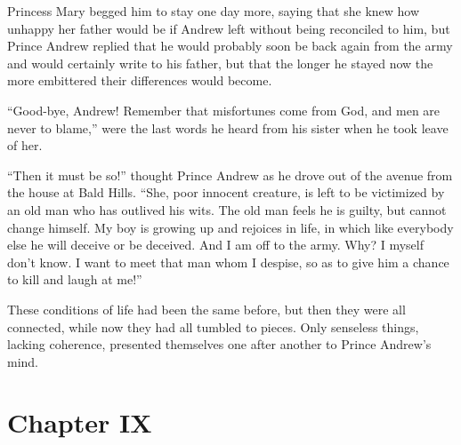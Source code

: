 Princess Mary begged him to stay one day more, saying that she
knew how unhappy her father would be if Andrew left without being
reconciled to him, but Prince Andrew replied that he would
probably soon be back again from the army and would certainly
write to his father, but that the longer he stayed now the more
embittered their differences would become.

``Good-bye, Andrew! Remember that misfortunes come from God, and
men are never to blame,'' were the last words he heard from his
sister when he took leave of her.

``Then it must be so!'' thought Prince Andrew as he drove out of
the avenue from the house at Bald Hills. ``She, poor innocent
creature, is left to be victimized by an old man who has outlived
his wits. The old man feels he is guilty, but cannot change
himself. My boy is growing up and rejoices in life, in which like
everybody else he will deceive or be deceived. And I am off to
the army. Why? I myself don't know. I want to meet that man whom
I despise, so as to give him a chance to kill and laugh at me!''

These conditions of life had been the same before, but then they
were all connected, while now they had all tumbled to
pieces. Only senseless things, lacking coherence, presented
themselves one after another to Prince Andrew's mind.


\chapter*{Chapter IX}
\ifaudio     
{} 
\fi

